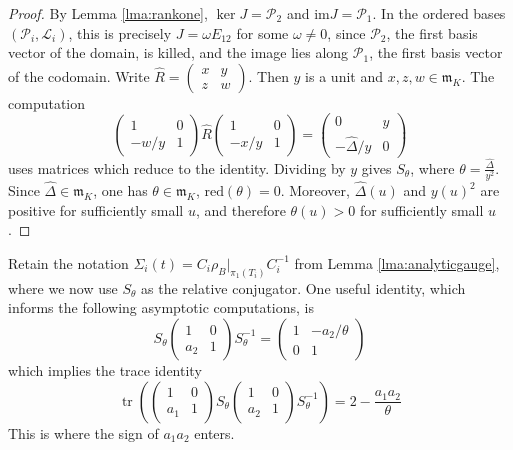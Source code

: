 \documentclass{article}
\DeclareMathOperator{\tr}{tr}
\newcommand{\im}[1]{\mathrm{im} #1}
\theoremstyle{plain}
\theoremstyle{definition}
\theoremstyle{plain}
\theoremstyle{plain}
\theoremstyle{plain}
\theoremstyle{remark}
\theoremstyle{remark}
\theoremstyle{plain}
\theoremstyle{plain}
\newcounter{main}
\theoremstyle{plain}
\theoremstyle{plain}
\begin{document}
\begin{proof}
By Lemma \ref{lma:rankone}, $\ker J = \mathcal P_2$ and $\im J = \mathcal P_1$. In the ordered bases $(\mathcal P_i, \mathcal L_i)$, this is precisely $J = \omega E_{12}$ for some $\omega \neq 0$, since $\mathcal P_2$, the first basis vector of the domain, is killed, and the image lies along $\mathcal P_1$, the first basis vector of the codomain. Write $\widehat R = \left(\begin{smallmatrix}x&y\\z&w\end{smallmatrix}\right)$. Then $y$ is a unit and $x, z, w \in \mathfrak m_K$. The computation
\begin{equation*}
	\begin{pmatrix}1 & 0 \\ -w/y & 1\end{pmatrix}\widehat R\begin{pmatrix}1 & 0 \\ -x/y & 1\end{pmatrix} = \begin{pmatrix}0 & y \\ -\widehat\Delta/y&0\end{pmatrix}
\end{equation*}
uses matrices which reduce to the identity. Dividing by $y$ gives $S_\theta$, where $\theta = \frac{\widehat\Delta}{y^2}$. Since $\widehat\Delta \in \mathfrak m_K$, one has $\theta \in \mathfrak m_K$, $\mathrm{red}(\theta) = 0$. Moreover, $\widehat\Delta(u)$ and $y(u)^2$ are positive for sufficiently small $u$, and therefore $\theta(u) > 0$ for sufficiently small $u$. 
\end{proof}

Retain the notation $\Sigma_i(t) = C_i\rho_B|_{\pi_1(T_i)}C_i^{-1}$ from Lemma \ref{lma:analyticgauge}, where we now use $S_\theta$ as the relative conjugator. One useful identity, which informs the following asymptotic computations, is 
\begin{equation*}
	S_\theta \begin{pmatrix}1 & 0 \\ a_2 & 1\end{pmatrix} S_\theta^{-1} = \begin{pmatrix}1 & -a_2/\theta \\ 0 & 1\end{pmatrix}
\end{equation*}
which implies the trace identity
\begin{equation*}
	\tr\left(\begin{pmatrix}1&0\\a_1&1\end{pmatrix}S_\theta\begin{pmatrix}1&0\\a_2&1\end{pmatrix}S_\theta^{-1}\right) = 2 - \frac{a_1a_2}{\theta}
\end{equation*}
This is where the sign of $a_1a_2$ enters. 
\end{document}

